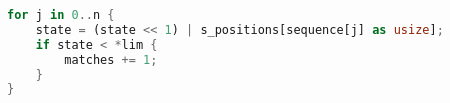 \begin{lstlisting}[language=Rust,caption={Bitap main loop in Rust},label={lst:bitap_rust}]
for j in 0..n {
    state = (state << 1) | s_positions[sequence[j] as usize];
    if state < *lim {
        matches += 1;
    }
}
\end{lstlisting}
